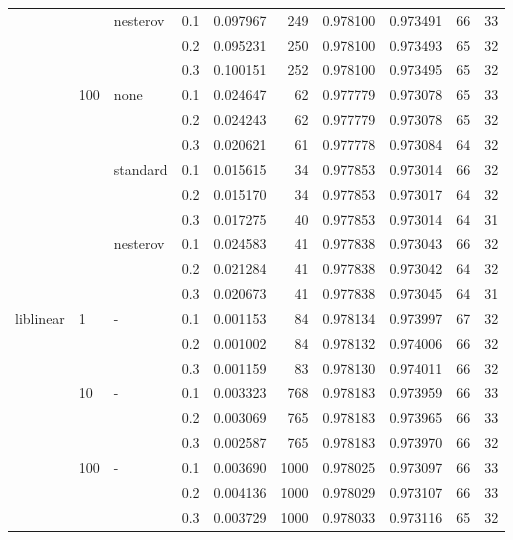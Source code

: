 \begin{table}[H]
\begin{tabular}{llllrrrrrr}
          &     & nesterov & 0.1 &  0.097967 &     249 &  0.978100 &  0.973491 &          66 &        33 \\
          &     &   & 0.2 &  0.095231 &     250 &  0.978100 &  0.973493 &          65 &        32 \\
          &     &   & 0.3 &  0.100151 &     252 &  0.978100 &  0.973495 &          65 &        32 \\
          & 100 & none & 0.1 &  0.024647 &      62 &  0.977779 &  0.973078 &          65 &        33 \\
          &     &   & 0.2 &  0.024243 &      62 &  0.977779 &  0.973078 &          65 &        32 \\
          &     &   & 0.3 &  0.020621 &      61 &  0.977778 &  0.973084 &          64 &        32 \\
          &     & standard & 0.1 &  0.015615 &      34 &  0.977853 &  0.973014 &          66 &        32 \\
          &     &   & 0.2 &  0.015170 &      34 &  0.977853 &  0.973017 &          64 &        32 \\
          &     &   & 0.3 &  0.017275 &      40 &  0.977853 &  0.973014 &          64 &        31 \\
          &     & nesterov & 0.1 &  0.024583 &      41 &  0.977838 &  0.973043 &          66 &        32 \\
          &     &   & 0.2 &  0.021284 &      41 &  0.977838 &  0.973042 &          64 &        32 \\
          &     &   & 0.3 &  0.020673 &      41 &  0.977838 &  0.973045 &          64 &        31 \\
liblinear & 1   & - & 0.1 &  0.001153 &      84 &  0.978134 &  0.973997 &          67 &        32 \\
          &     &   & 0.2 &  0.001002 &      84 &  0.978132 &  0.974006 &          66 &        32 \\
          &     &   & 0.3 &  0.001159 &      83 &  0.978130 &  0.974011 &          66 &        32 \\
          & 10  & - & 0.1 &  0.003323 &     768 &  0.978183 &  0.973959 &          66 &        33 \\
          &     &   & 0.2 &  0.003069 &     765 &  0.978183 &  0.973965 &          66 &        33 \\
          &     &   & 0.3 &  0.002587 &     765 &  0.978183 &  0.973970 &          66 &        32 \\
          & 100 & - & 0.1 &  0.003690 &    1000 &  0.978025 &  0.973097 &          66 &        33 \\
          &     &   & 0.2 &  0.004136 &    1000 &  0.978029 &  0.973107 &          66 &        33 \\
          &     &   & 0.3 &  0.003729 &    1000 &  0.978033 &  0.973116 &          65 &        32 \\
\bottomrule
\end{tabular}
\end{table}
